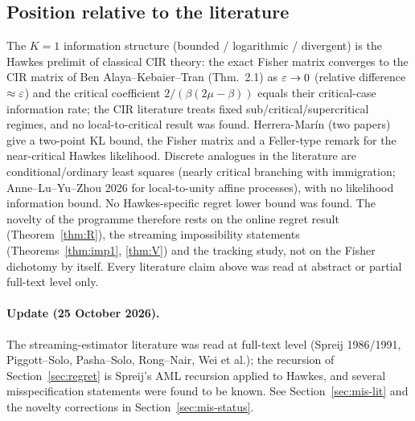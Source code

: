 \subsection{Position relative to the literature}
The $K=1$ information structure (bounded / logarithmic / divergent) is the Hawkes prelimit of classical CIR theory: the exact Fisher matrix converges to the CIR matrix of Ben Alaya--Kebaier--Tran (Thm.~2.1) as $\varepsilon\to0$ (relative difference $\approx\varepsilon$) and the critical coefficient $2/(\beta(2\mu-\beta))$ equals their critical-case information rate; the CIR literature treats fixed sub/critical/supercritical regimes, and no local-to-critical result was found. Herrera-Mar\'in (two papers) give a two-point KL bound, the Fisher matrix and a Feller-type remark for the near-critical Hawkes likelihood. Discrete analogues in the literature are conditional/ordinary least squares (nearly critical branching with immigration; Anne--Lu--Yu--Zhou 2026 for local-to-unity affine processes), with no likelihood information bound. No Hawkes-specific regret lower bound was found. The novelty of the programme therefore rests on the online regret result (Theorem~\ref{thm:R}), the streaming impossibility statements (Theorems~\ref{thm:imp1}, \ref{thm:V}) and the tracking study, not on the Fisher dichotomy by itself. Every literature claim above was read at abstract or partial full-text level only.

\paragraph{Update (25 October 2026).} The streaming-estimator literature was read at full-text level (Spreij 1986/1991, Piggott--Solo, Pasha--Solo, Rong--Nair, Wei et al.); the recursion of Section~\ref{sec:regret} is Spreij's AML recursion applied to Hawkes, and several misspecification statements were found to be known. See Section~\ref{sec:mis-lit} and the novelty corrections in Section~\ref{sec:mis-status}.

